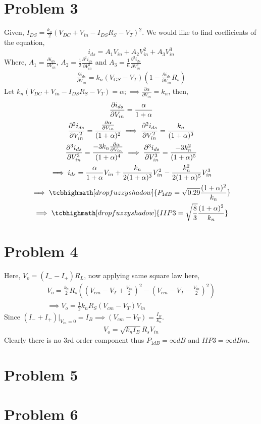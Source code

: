 \documentclass{article}
\begin{document}
\section*{\hfil Problem 3}
Given, $I_{DS} = \frac{k_n}{2}(V_{DC} + V_{in} - I_{DS}R_S - V_T)^2$. We would like to find coefficients of the equation,
\begin{equation*}
	i_{ds} = A_1V_{in} + A_2V_{in}^2 + A_3V_{in}^3
\end{equation*}
Where, $A_1 = \frac{\partial i_{ds}}{\partial V_{in}}$, $A_2 = \frac{1}{2}\frac{{\partial}^2 i_{ds}}{\partial V_{in}^2}$ and $A_3 = \frac{1}{6}\frac{{\partial}^3 i_{ds}}{\partial V_{in}^3}$
\begin{gather*}
	\frac{\partial i_{ds}}{\partial V_{in}} = k_n(V_{GS} - V_T)\left(1 - \frac{\partial i_{ds}}{\partial V_{in}}R_s\right)
\end{gather*}
Let $k_n(V_{DC} + V_{in} - I_{DS}R_S - V_T) = \alpha; \implies \frac{\partial \alpha}{\partial V_{in}} = k_n$, then,
\begin{gather*}
	\frac{\partial i_{ds}}{\partial V_{in}} = \frac{\alpha}{1 + \alpha}\\
	\frac{{\partial}^2 i_{ds}}{\partial V_{in}^2} = \frac{\frac{\partial \alpha}{\partial V_{in}}}{(1+\alpha)^2}
	\implies \frac{{\partial}^2 i_{ds}}{\partial V_{in}^2} = \frac{k_n}{(1+\alpha)^3}\\
	\frac{{\partial}^3 i_{ds}}{\partial V_{in}^3} = \frac{-3k_n\frac{\partial \alpha}{\partial V_{in}}}{(1+\alpha)^4}
	\implies \frac{{\partial}^3 i_{ds}}{\partial V_{in}^3} = \frac{-3k_n^2}{(1+\alpha)^5}\\
	\implies i_{ds} = \frac{\alpha}{1 + \alpha} V_{in} + \frac{k_n}{2(1+\alpha)^3}V_{in}^2 - \frac{k_n^2}{2(1+\alpha)^5}V_{in}^3\\
	\implies \tcbhighmath[drop fuzzy shadow]{P_{1dB} = \sqrt{0.29}\frac{(1+\alpha)^2}{k_n}}\\
	\implies \tcbhighmath[drop fuzzy shadow]{IIP3 = \sqrt{\frac{8}{3}}\frac{(1+\alpha)^2}{k_n}}
\end{gather*}
\section*{\hfil Problem 4}
Here, $V_o = (I_{-} - I_{+})R_L$, now applying same square law here,
\begin{gather*}
	V_o = \frac{k_n}{2}R_s((V_{cm} - V_T + \frac{V_{in}}{2})^2 - (V_{cm} - V_T - \frac{V_{in}}{2})^2)\\
	\implies V_o = \frac{1}{2}k_nR_S(V_{cm} - V_T)V_{in}
\end{gather*}
Since $(I_{-} + I_{+})|_{V_{in} = 0} = I_B \implies (V_{cm} - V_T) = \frac{I_B}{k_n}$.
\begin{gather*}
	V_o = \sqrt{k_nI_B}R_sV_{in}
\end{gather*}
Clearly there is no 3rd order component thus $P_{1dB} = \infty dB$ and $IIP3 = \infty dBm$.
\section*{\hfil Problem 5}
\section*{\hfil Problem 6}
\end{document}
